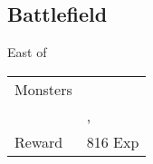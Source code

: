 \subsection{Battlefield}
\label{map:battlefield_14}

East of 

\noindent\begin{tabularx}{\textwidth}[l]{lX}
	Monsters
	& \nameref{monster:plant_man} \\
	& \nameref{monster:plant_man}, \nameref{monster:plant_man}
\\ \hline
	Reward & 816 Exp
\end{tabularx}
